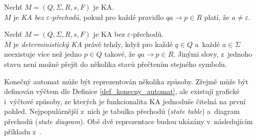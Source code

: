 \begin{definition}
    Nechť $M = (Q, \Sigma, R, s, F)$ je KA.\\
    $M$ je \emph{KA bez $\varepsilon$-přechodů}, pokud pro každé pravidlo $qa \rightarrow p \in R$ platí, že $a \neq \varepsilon$.
\end{definition}

\begin{definition}
    Nechť $M = (Q, \Sigma, R, s, F)$ je KA bez $\varepsilon$-přechodů.\\
    $M$ je \emph{deterministický KA} právě tehdy, když pro každé $q \in Q$ a~každé $a \in \Sigma$ neexistuje více než jedno $p \in Q$ takové, že $qa \rightarrow p \in R$.
    Jinými slovy, z~jednoho stavu není možné přejít do několika stavů přečtením stejného symbolu.
\end{definition}

Konečný automat může být reprezentován několika způsoby.
Zřejmě může být definován výčtem dle Definice \ref{def_konecny_automat}, ale existují grafické i~výčtové způsoby, ze kterých je funkcionalita KA jednoduše čitelná na první pohled.
Nejpopulárnější z~nich je tabulka přechodů (\emph{state table}) a~diagram přechodů (\emph{state diagram}).
Obě dvě reprezentace budou ukázány v~následujícím příkladu z~\cite{meduna2023automata}.

